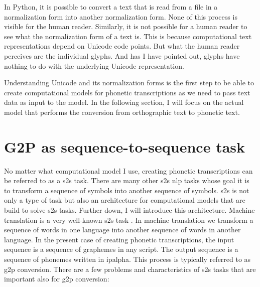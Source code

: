 In Python, it is possible to convert a text that is read from a file in a normalization form into another normalization form. None of this process is visible for the human reader. Similarly, it is not possible for a human reader to see what the normalization form of a text is. This is because computational text representations depend on Unicode code points. But what the human reader perceives are the individual glyphs. And has I have pointed out, glyphs have nothing to do with the underlying Unicode representation.  

Understanding Unicode and its normalization forms is the first step to be able to create computational models for phonetic transcriptions as we need to pass text data as input to the model. In the following section, I will focus on the actual model that performs the conversion from orthographic text to phonetic text.

\section{G2P as sequence-to-sequence task}
\label{model_theory}
No matter what computational model I use, creating phonetic transcriptions can be referred to as a \acf{s2s} task. There are many other \ac{s2s} \ac{nlp} tasks whose goal it is to transform a sequence of symbols into another sequence of symbols. \ac{s2s} is not only a type of task but also an architecture for computational models that are build to solve \ac{s2s} tasks. Further down, I will introduce this architecture. Machine translation is a very well-known \ac{s2s} task \citep{Rao2015GraphemetophonemeCU}. In machine translation we transform a sequence of words in one language into another sequence of words in another language. In the present case of creating phonetic transcriptions, the input sequence is a sequence of graphemes in any script. The output sequence is a sequence of phonemes written in \ac{ipalpha}. This process is typically referred to as \acf{g2p} conversion. There are a few problems and characteristics of \ac{s2s} tasks that are important also for \ac{g2p} conversion:

